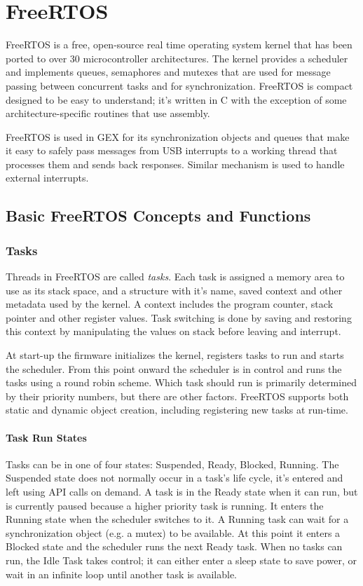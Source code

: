 \chapter{FreeRTOS}

FreeRTOS is a free, open-source real time operating system kernel that has been ported to over 30 microcontroller architectures. The kernel provides a scheduler and implements queues, semaphores and mutexes that are used for message passing between concurrent tasks and for synchronization. FreeRTOS is compact designed to be easy to understand; it's written in C with the exception of some architecture-specific routines that use assembly.

FreeRTOS is used in GEX for its synchronization objects and queues that make it easy to safely pass messages from USB interrupts to a working thread that processes them and sends back responses. Similar mechanism is used to handle external interrupts.

\section{Basic FreeRTOS Concepts and Functions}

\subsection{Tasks}

Threads in FreeRTOS are called \textit{tasks}. Each task is assigned a memory area to use as its stack space, and a structure with it's name, saved context and other metadata used by the kernel. A context includes the program counter, stack pointer and other register values. Task switching is done by saving and restoring this context by manipulating the values on stack before leaving and interrupt.

At start-up the firmware initializes the kernel, registers tasks to run and starts the scheduler. From this point onward the scheduler is in control and runs the tasks using a round robin scheme. Which task should run is primarily determined by their priority numbers, but there are other factors. FreeRTOS supports both static and dynamic object creation, including registering new tasks at run-time.

\subsubsection{Task Run States}

Tasks can be in one of four states: Suspended, Ready, Blocked, Running. The Suspended state does not normally occur in a task's life cycle, it's entered and left using API calls on demand. A task is in the Ready state when it can run, but is currently paused because a higher priority task is running. It enters the Running state when the scheduler switches to it. A Running task can wait for a synchronization object (e.g. a mutex) to be available. At this point it enters a Blocked state and the scheduler runs the next Ready task. When no tasks can run, the Idle Task takes control; it can either enter a sleep state to save power, or wait in an infinite loop until another task is available.

